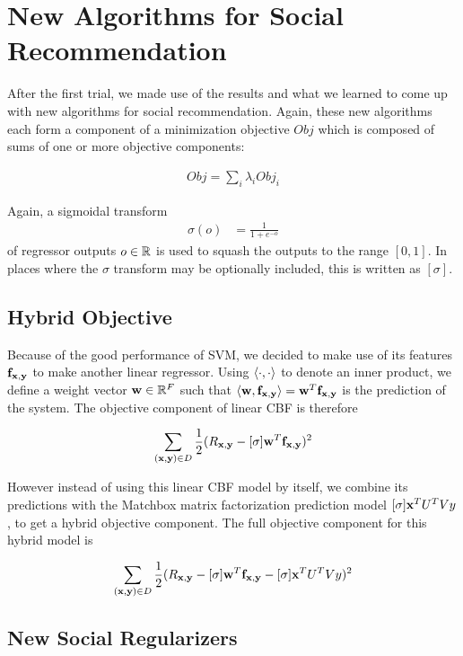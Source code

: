 \chapter{New Algorithms for Social Recommendation}

After the first trial, we made use of the results and what we learned to come up with new algorithms for social recommendation. Again, these new algorithms each form a component of a minimization objective $Obj$ which is composed of sums of one or more objective components:

\begin{align}
\mathit{Obj} = \sum_i \lambda_i \mathit{Obj}_i
\end{align}

Again, a sigmoidal transform 
\begin{align}
\sigma(o) & = \frac{1}{1 + e^{-o}}
\end{align}
of regressor outputs $o \in \mathbb{R}$ is used to squash the outputs 
to the range $[0, 1]$.  
In places where the $\sigma$ transform may be optionally included, 
this is written as $[\sigma]$.  

\section{Hybrid Objective}

Because of the good performance of SVM, we decided to make use of its features $\mathbf{f}_{\mathbf{x},\mathbf{y}}$  to make another linear regressor. Using $\langle \cdot,\cdot \rangle$ to denote an inner product, we define a weight
vector $\mathbf{w} \in \mathbb{R}^F$ such that $\langle \mathbf{w}, \mathbf{f}_{\mathbf{x},\mathbf{y}} \rangle = \mathbf{w}^T \mathbf{f}_{\mathbf{x},\mathbf{y}}$ is the prediction of the system. The objective component of linear CBF is therefore

\begin{align}
\sum_{(\mathbf{x},\mathbf{y}) \in D} \frac{1}{2} (R_{\mathbf{x},\mathbf{y}} - [\sigma] \mathbf{w}^T \mathbf{f}_{\mathbf{x},\mathbf{y}})^2
\end{align}

However instead of using this linear CBF model by itself, we combine its predictions with the  Matchbox matrix factorization prediction model $[\sigma] \mathbf{x}^T U^T V y$, to get a hybrid objective component. The full objective component for this hybrid model is

\begin{align}
\sum_{(\mathbf{x},\mathbf{y}) \in D} \frac{1}{2} (R_{\mathbf{x},\mathbf{y}} - [\sigma] \mathbf{w}^T \mathbf{f}_{\mathbf{x},\mathbf{y}} - [\sigma] \mathbf{x}^T U^T V y)^2
\end{align}

\section{New Social Regularizers}

